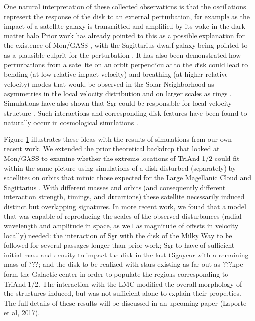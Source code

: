 \documentclass[galaxies,article,submit,moreauthors,pdftex,10pt,a4paper]{mdpi}
\begin{document}
One natural interpretation of these collected observations is that the oscillations represent the response of the disk to an external perturbation, for example as the impact of a satellite galaxy is transmitted and amplified by its wake in the dark matter halo \cite[as described for the LMC in][]{weinberg06}
Prior work has already pointed to this as a possible explanation for the existence of Mon/GASS \cite{kazantzidis08,younger08}, with the Sagittarius dwarf galaxy being pointed to as a plausible culprit for the perturbation \cite{purcell11}.
It has also been demonstrated how perturbations from a satellite on an orbit perpendicular to the disk could lead to bending (at low relative impact velocity) and breathing (at higher relative velocity) modes that would be observed in the Solar Neighborhood as asymmetries in the local velocity distribution  \cite{widrow14} and on larger scales as rings \cite{donghia16}.
Simulations have also shown that Sgr could be responsible for local velocity structure  \cite{gomez13}.
Such interactions and corresponding disk features have been found to naturally occur in cosmological simulations \cite{gomez16}.

\begin{figure}[t]
\centering
\caption{\label{fig:chervin}
}
\end{figure}

Figure \ref{fig:chervin} illustrates these ideas with the results of simulations from our own recent work.
We extended the prior theoretical backdrop that looked at Mon/GASS to examine whether the extreme locations of TriAnd 1/2 could fit within the same picture using simulations of a disk disturbed (separately) by satellites on orbits that mimic those expected for the Large Magellanic Cloud and Sagittarius \cite{laporte16}.
With different masses and orbits (and consequently different interaction  strength, timings, and durartions) these satellite necessarily induced distinct but overlapping signatures.
In  more recent work, we found that a model that was capable of reproducing the scales of the observed disturbances (radial wavelength and  amplitude in space, as well as magnitude of offsets in velocity locally) needed:
the  interaction of Sgr with the disk of the Milky Way to be followed for several passages longer than prior work;
Sgr to have of sufficient initial mass and density to impact the disk in the last Gigayear with a remaining mass of ???;
and the disk to be realized with stars existing as far out as ???kpc form the Galactic center in order to populate the regions corresponding to TriAnd 1/2.
The interaction with the LMC modified the overall morphology of the structures induced, but was not sufficient alone to explain their properties.
The full details of these results will be discussed in an upcoming paper (Laporte et al, 2017).
\end{document}
